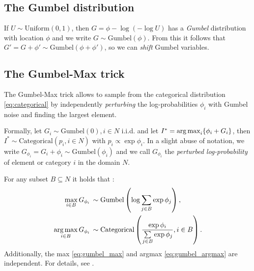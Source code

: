 \subsection{The Gumbel distribution}
\label{sec:gumbel_distribution}
If $U \sim \text{Uniform}(0,1)$, then $G = \phi - \log (- \log U)$ has a \emph{Gumbel} distribution with location $\phi$ and we write $G \sim \text{Gumbel}(\phi)$. From this it follows that $G' = G + \phi' \sim \text{Gumbel}(\phi + \phi')$, so we can \emph{shift} Gumbel variables.

\subsection{The Gumbel-Max trick}
\label{sec:gumbel_max_trick}
The Gumbel-Max trick \citep{gumbel1954statistical, maddison2014sampling} allows to sample from the categorical distribution \eqref{eq:categorical} by independently \emph{perturbing} the log-probabilities $\phi_i$ with Gumbel noise and finding the largest element.

Formally, let $G_i \sim \text{Gumbel}(0), i \in N$ i.i.d. and let $I^* = \operatorname*{arg\,max}_i \{ \phi_i + G_i \}$, then $I^* \sim \text{Categorical}(p_i, i \in N)$ with $p_i \propto \exp \phi_i$.
In a slight abuse of notation, we write $G_{\phi_i} = G_i + \phi_i \sim \text{Gumbel}(\phi_i)$ and we call $G_{\phi_i}$ the \emph{perturbed log-probability} of element or category $i$ in the domain $N$.

For any subset $B \subseteq N$ it holds that \citep{maddison2014sampling}:
\begin{align}
\label{eq:gumbel_max}
    \max_{i \in B} G_{\phi_i} & \, \sim \text{Gumbel} \left( \log \sum_{j \in B} \exp{\phi_j}\right), \\
\label{eq:gumbel_argmax}
    \operatorname*{arg\,max}_{i \in B} G_{\phi_i} & \, \sim \text{Categorical} \left( \frac{\exp{\phi_i}}{\sum\limits_{j \in B} \exp{\phi_j}}, i \in B \right).
\end{align}
Additionally, the max \eqref{eq:gumbel_max} and argmax \eqref{eq:gumbel_argmax} are independent. For details, see \citet{maddison2014sampling}.

